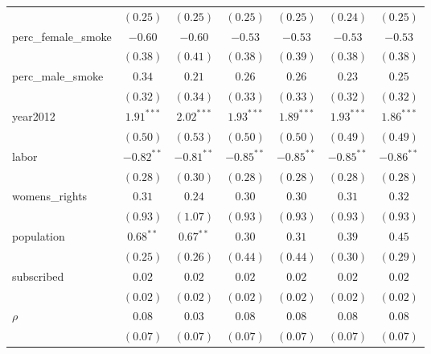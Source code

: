 \begin{table}[!h]
\begin{center}
\begin{tabular}{l c c c c c c }
                        & $(0.25)$     & $(0.25)$     & $(0.25)$     & $(0.25)$     & $(0.24)$     & $(0.25)$     \\
perc\_female\_smoke     & $-0.60$      & $-0.60$      & $-0.53$      & $-0.53$      & $-0.53$      & $-0.53$      \\
                        & $(0.38)$     & $(0.41)$     & $(0.38)$     & $(0.39)$     & $(0.38)$     & $(0.38)$     \\
perc\_male\_smoke       & $0.34$       & $0.21$       & $0.26$       & $0.26$       & $0.23$       & $0.25$       \\
                        & $(0.32)$     & $(0.34)$     & $(0.33)$     & $(0.33)$     & $(0.32)$     & $(0.32)$     \\
year2012                & $1.91^{***}$ & $2.02^{***}$ & $1.93^{***}$ & $1.89^{***}$ & $1.93^{***}$ & $1.86^{***}$ \\
                        & $(0.50)$     & $(0.53)$     & $(0.50)$     & $(0.50)$     & $(0.49)$     & $(0.49)$     \\
labor                   & $-0.82^{**}$ & $-0.81^{**}$ & $-0.85^{**}$ & $-0.85^{**}$ & $-0.85^{**}$ & $-0.86^{**}$ \\
                        & $(0.28)$     & $(0.30)$     & $(0.28)$     & $(0.28)$     & $(0.28)$     & $(0.28)$     \\
womens\_rights          & $0.31$       & $0.24$       & $0.30$       & $0.30$       & $0.31$       & $0.32$       \\
                        & $(0.93)$     & $(1.07)$     & $(0.93)$     & $(0.93)$     & $(0.93)$     & $(0.93)$     \\
population              & $0.68^{**}$  & $0.67^{**}$  & $0.30$       & $0.31$       & $0.39$       & $0.45$       \\
                        & $(0.25)$     & $(0.26)$     & $(0.44)$     & $(0.44)$     & $(0.30)$     & $(0.29)$     \\
subscribed              & $0.02$       & $0.02$       & $0.02$       & $0.02$       & $0.02$       & $0.02$       \\
                        & $(0.02)$     & $(0.02)$     & $(0.02)$     & $(0.02)$     & $(0.02)$     & $(0.02)$     \\
$\rho$                  & $0.08$       & $0.03$       & $0.08$       & $0.08$       & $0.08$       & $0.08$       \\
                        & $(0.07)$     & $(0.07)$     & $(0.07)$     & $(0.07)$     & $(0.07)$     & $(0.07)$     \\

\end{tabular}
\end{center}
\end{table}
